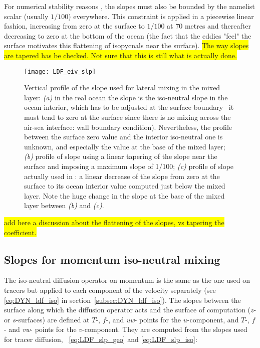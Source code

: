 \documentclass[../main/NEMO_manual]{subfiles}
\begin{document}
For numerical stability reasons \citep{cox_OM87, griffies_bk04}, the slopes must also be bounded by
the namelist scalar  (usually $1/100$) everywhere.
This constraint is applied in a piecewise linear fashion, increasing from zero at the surface to
$1/100$ at $70$ metres and thereafter decreasing to zero at the bottom of the ocean
(the fact that the eddies "feel" the surface motivates this flattening of isopycnals near the surface).
\colorbox{yellow}{The way slopes are tapered has be checked. Not sure that this is still what is actually done.}

\begin{figure}[!ht]
  \centering
  \texttt{[image: LDF\_eiv\_slp]}
  \caption[Vertical profile of the slope used for lateral mixing in the mixed layer]{
    Vertical profile of the slope used for lateral mixing in the mixed layer:
    \textit{(a)} in the real ocean the slope is the iso-neutral slope in the ocean interior,
    which has to be adjusted at the surface boundary
    \ie\ it must tend to zero at the surface since there is no mixing across the air-sea interface:
    wall boundary condition).
    Nevertheless,
    the profile between the surface zero value and the interior iso-neutral one is unknown,
    and especially the value at the base of the mixed layer;
    \textit{(b)} profile of slope using a linear tapering of the slope near the surface and
    imposing a maximum slope of 1/100;
    \textit{(c)} profile of slope actually used in \NEMO:
    a linear decrease of the slope from zero at the surface to
    its ocean interior value computed just below the mixed layer.
    Note the huge change in the slope at the base of the mixed layer between
    \textit{(b)} and \textit{(c)}.}
  \label{fig:LDF_eiv_slp}
\end{figure}

\colorbox{yellow}{add here a discussion about the flattening of the slopes, vs tapering the coefficient.}

\subsection{Slopes for momentum iso-neutral mixing}

The iso-neutral diffusion operator on momentum is the same as the one used on tracers but
applied to each component of the velocity separately
(see \autoref{eq:DYN_ldf_iso} in section~\autoref{subsec:DYN_ldf_iso}).
The slopes between the surface along which the diffusion operator acts and the surface of computation
($z$- or $s$-surfaces) are defined at $T$-, $f$-, and \textit{uw}- points for the $u$-component, and $T$-, $f$- and
\textit{vw}- points for the $v$-component.
They are computed from the slopes used for tracer diffusion,
\ie\ \autoref{eq:LDF_slp_geo} and \autoref{eq:LDF_slp_iso}:
\end{document}

